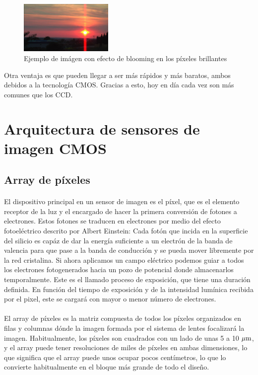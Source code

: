 \begin{figure}[h]
	\centering
	\includegraphics[width=0.4\textwidth]{img/blooming.jpg}
	\caption{Ejemplo de imágen con efecto de blooming en los píxeles brillantes}
	\label{fig:blooming}
\end{figure}

Otra ventaja es que pueden llegar a ser más rápidos y más baratos, ambos debidos
a la tecnología CMOS. Gracias a esto, hoy en día cada vez son más comunes que los
CCD.

\section{Arquitectura de sensores de imagen CMOS}

\subsection{Array de píxeles}\label{cap:pxa_array}

\paragraph{}
El dispositivo principal en un sensor de imagen es el píxel, que es el elemento
receptor de la luz y el encargado de hacer la primera conversión de fotones a
electrones. Estos fotones se traducen en electrones por medio del efecto fotoeléctrico
descrito por Albert Einstein: Cada fotón que incida en la superficie del silicio
es capáz de dar la energía suficiente a un electrón de la banda de valencia para que
pase a la banda de conducción y se pueda mover libremente por la red cristalina.
Si ahora aplicamos un campo eléctrico podemos guiar a todos los electrones
fotogenerados hacia un pozo de potencial donde almacenarlos temporalmente. Este
es el llamado proceso de exposición, que tiene una duración definida. En función
del tiempo de exposición y de la intensidad lumínica recibida por el pixel, este
se cargará con mayor o menor número de electrones.

\paragraph{}
El array de píxeles es la matriz compuesta de todos los píxeles organizados en filas
y columnas dónde la imagen formada por el sistema de lentes focalizará la imagen.
Habitualmente, los píxeles son cuadrados con un lado de unas 5 a 10 $\mu\text{m}$, y el
array puede tener resoluciones de miles de píxeles en ambas dimensiones, lo que
significa que el array puede unos ocupar pocos centímetros, lo que lo convierte
habitualmente en el bloque más grande de todo el diseño.

